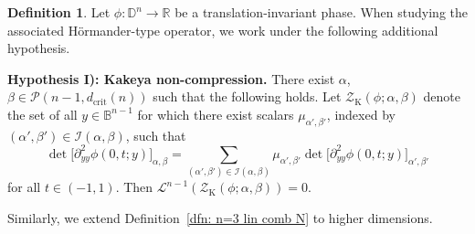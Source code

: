 \documentclass[reqno]{amsart}
\numberwithin{equation}{section}
\newcommand{\B}{\mathbb{B}}
\newcommand{\D}{\mathbb{D}}
\newcommand{\R}{\mathbb{R}}
\newcommand{\cI}{\mathcal{I}}
\newcommand{\cL}{\mathcal{L}}
\newcommand{\cP}{\mathcal{P}}
\newcommand{\cZ}{\mathcal{Z}}
\theoremstyle{plain}
\theoremstyle{definition}
\newtheorem{definition}[theorem]{Definition}
\newcommand{\crit}{\mathrm{crit}}
\begin{document}
\begin{definition}\label{dfn: lin comb K} Let $\phi \colon \D^n \to \R$ be a translation-invariant phase.  When studying the associated H\"ormander-type operator, we work under the following additional hypothesis.\medskip


\noindent \textbf{Hypothesis I): Kakeya non-compression.} There exist $\alpha$, $\beta \in \cP(n-1, d_{\crit}(n))$ such that the following holds. Let $\cZ_{\mathrm{K}}(\phi; \alpha, \beta)$ denote the set of all $y \in \B^{n-1}$ for which there exist scalars $\mu_{\alpha',\beta'}$, indexed by $(\alpha', \beta') \in \cI(\alpha,\beta)$, such that
   \begin{equation*}
    \det\big[ \partial_{yy}^2\phi(0,t;y)\big]_{\alpha,\beta} = \sum_{(\alpha', \beta') \in \cI(\alpha,\beta)} \mu_{\alpha',\beta'} \det\big[\partial_{yy}^2 \phi(0,t;y)\big]_{\alpha',\beta'}
\end{equation*} 
for all $t \in (-1,1)$. Then $\cL^{n-1}(\cZ_{\mathrm{K}}(\phi; \alpha, \beta)) = 0$.
\end{definition}

Similarly, we extend Definition~\ref{dfn: n=3 lin comb N} to higher dimensions. 
\end{document}
